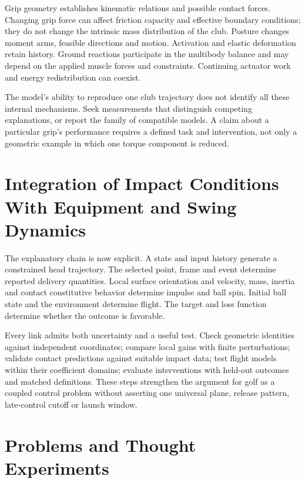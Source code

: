 Grip geometry establishes kinematic relations and possible contact forces.
Changing grip force can affect friction capacity and effective boundary
conditions; they do not change the intrinsic mass distribution of the club.
Posture changes moment arms, feasible directions and motion. Activation and
elastic deformation retain history. Ground reactions participate in the
multibody balance and may depend on the applied muscle forces and constraints.
Continuing actuator work and energy redistribution can coexist.

The model's ability to reproduce one club trajectory does not identify all
these internal mechanisms. Seek measurements that distinguish competing
explanations, or report the family of compatible models. A claim about a
particular grip's performance requires a defined task and intervention,
not only a geometric example in which one torque component is reduced.

\section{Integration of Impact Conditions With Equipment and Swing Dynamics}

The explanatory chain is now explicit. A state and input history generate a
constrained head trajectory. The selected point, frame and event determine
reported delivery quantities. Local surface orientation and velocity, mass,
inertia and contact constitutive behavior determine impulse and ball spin.
Initial ball state and the environment determine flight. The target and loss
function determine whether the outcome is favorable.

Every link admits both uncertainty and a useful test. Check geometric
identities against independent coordinates; compare local gains with finite
perturbations; validate contact predictions against suitable impact data;
test flight models within their coefficient domains; evaluate interventions
with held-out outcomes and matched definitions. These steps strengthen the
argument for golf as a coupled control problem without asserting one
universal plane, release pattern, late-control cutoff or launch window.

\section{Problems and Thought Experiments}
\label{ex:launch}
\label{exercises:ex:launch}

